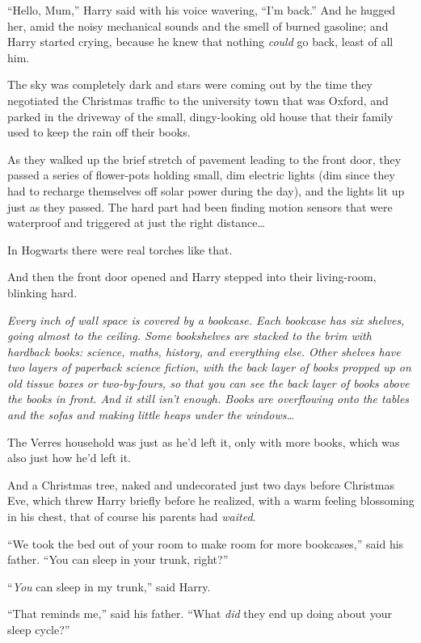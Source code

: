 “Hello, Mum,” Harry said with his voice wavering, “I’m back.” And he hugged her, amid the noisy mechanical sounds and the smell of burned gasoline; and Harry started crying, because he knew that nothing \emph{could} go back, least of all him.

\later

The sky was completely dark and stars were coming out by the time they negotiated the Christmas traffic to the university town that was Oxford, and parked in the driveway of the small, dingy-looking old house that their family used to keep the rain off their books.

As they walked up the brief stretch of pavement leading to the front door, they passed a series of flower-pots holding small, dim electric lights (dim since they had to recharge themselves off solar power during the day), and the lights lit up just as they passed. The hard part had been finding motion sensors that were waterproof and triggered at just the right distance…

In Hogwarts there were real torches like that.

And then the front door opened and Harry stepped into their living-room, blinking hard.

\emph{Every inch of wall space is covered by a bookcase. Each bookcase has six shelves, going almost to the ceiling. Some bookshelves are stacked to the brim with hardback books: science, maths, history, and everything else. Other shelves have two layers of paperback science fiction, with the back layer of books propped up on old tissue boxes or two-by-fours, so that you can see the back layer of books above the books in front. And it still isn’t enough. Books are overflowing onto the tables and the sofas and making little heaps under the windows…}

The Verres household was just as he’d left it, only with more books, which was also just how he’d left it.

And a Christmas tree, naked and undecorated just two days before Christmas Eve, which threw Harry briefly before he realized, with a warm feeling blossoming in his chest, that of course his parents had \emph{waited}.

“We took the bed out of your room to make room for more bookcases,” said his father. “You can sleep in your trunk, right?”

“\emph{You} can sleep in my trunk,” said Harry.

“That reminds me,” said his father. “What \emph{did} they end up doing about your sleep cycle?”

